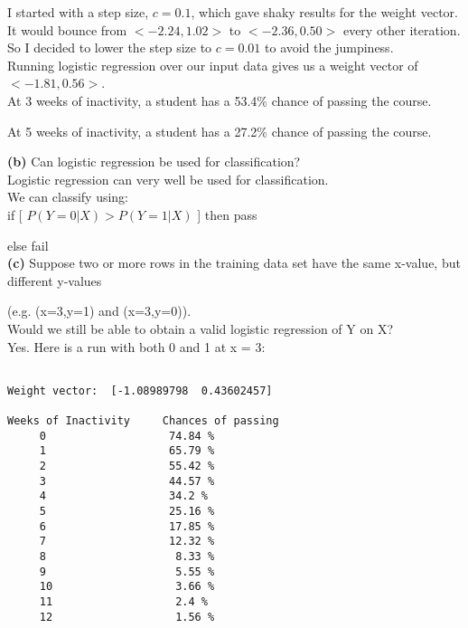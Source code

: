 \documentclass{article}
\begin{document}
I started with a step size, $c = 0.1$, which gave shaky results for the weight vector. It would bounce from $ < -2.24, 1.02 >$ to $ < -2.36, 0.50 >$ every other iteration. \\
So I decided to lower the step size to $c = 0.01$ to avoid the jumpiness. \\

Running logistic regression over our input data gives us a weight vector of $ < -1.81,  0.56 > $. \\

At 3 weeks of inactivity, a student has a 53.4\% chance of passing the course.

At 5 weeks of inactivity, a student has a 27.2\% chance of passing the course. \\

\newpage

\hspace{-2.5em} \textbf{(b)} Can logistic regression be used for classification? \\

Logistic regression can very well be used for classification. \\

We can classify using: \\

if [ $P( Y=0 | X) > P( Y=1 | X)$ ] then pass

\hspace{1em} else fail \\

\hspace{-2.5em} \textbf{(c)} Suppose two or more rows in the training data set have the same x-value, but different y-values

\hspace{1em} (e.g. (x=3,y=1) and (x=3,y=0)). \\

Would we still be able to obtain a valid logistic regression of Y on X? \\

Yes. Here is a run with both 0 and 1 at x = 3:

\begin{lstlisting}[breaklines=true,basicstyle=\small]

Weight vector:  [-1.08989798  0.43602457]

Weeks of Inactivity		Chances of passing
	 0 					 74.84 %
	 1 					 65.79 %
	 2 					 55.42 %
	 3 					 44.57 %
	 4 					 34.2 %
	 5 		 			 25.16 %
	 6 		 			 17.85 %
	 7 		 			 12.32 %
	 8 		 			  8.33 %
	 9 					  5.55 %
	 10 				  3.66 %
	 11 				  2.4 %
	 12 				  1.56 %
\end{lstlisting}
\end{document}

